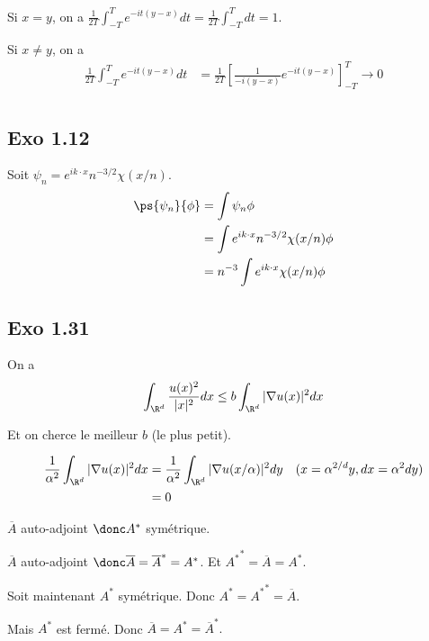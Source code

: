 Si $x = y$, on a
$\frac{1}{2T} \int_{-T}^T  e^{-it(y-x)} dt = \frac{1}{2T} \int_{-T}^T dt = 1.$

Si $x \neq y$, on a
\begin{align}
    \frac{1}{2T} \int_{-T}^T  e^{-it(y-x)} dt
    &= \frac{1}{2T}
    \left[ \frac{1}{-i(y-x)} e^{-it(y-x)} \right]_{-T}^T \to 0 \\
\end{align}



\subsection{Exo 1.12}

Soit $\psi_n = e^{ik \cdot x} n^{-3/2}\chi(x/n)$.
\begin{align}
    \ps{\psi_n}{\phi} &= \int \psi_n \phi \\
    &= \int e^{ik \cdot x} n^{-3/2}\chi(x/n) \phi \\
    &= n^{-3} \int e^{ik \cdot x} \chi(x/n) \phi \\
\end{align}





\newpage
\subsection{Exo 1.31}

On a
\begin{align}
    \int_{\R^d} \frac{u(x)^2}{|x|^2} dx \leq b \int_{\R^d} |\nabla u(x)|^2 dx
\end{align}

Et on cherce le meilleur $b$ (le plus petit).

\begin{align}
    \frac{1}{\alpha^2} \int_{\R^d} |\nabla u(x)|^2 dx &=
    \frac{1}{\alpha^2} \int_{\R^d} |\nabla u(x/\alpha)|^2 dy
    \quad (x = \alpha^{2/d} y, dx = \alpha^2 dy) \\
    &= 0
\end{align}




$\overline A$ auto-adjoint $\donc A^*$ symétrique.

$\overline A$ auto-adjoint
$\donc \overline A = \overline A^* = A^*$.
Et ${A^*}^* = \overline A = A^*.$

Soit maintenant $A^*$ symétrique. Donc $A^* = {A^*}^* = \overline A.$

Mais $A^*$ est fermé. Donc $\overline A= A^* = \overline A^*.$












